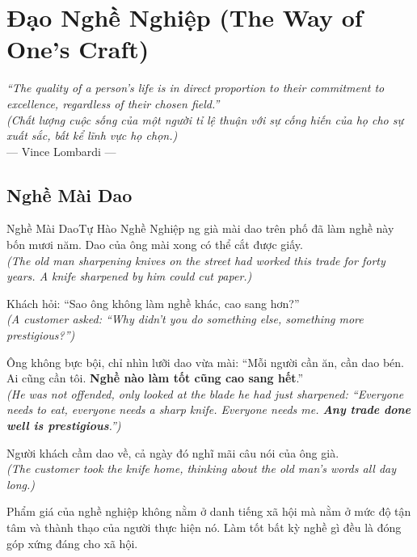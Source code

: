 \chapter{Đạo Nghề Nghiệp (The Way of One's Craft)}

\begin{center}
  \textit{\color{truyenblue}``The quality of a person's life is in direct proportion to their commitment to excellence, regardless of their chosen field.''}\\
  \textit{(Chất lượng cuộc sống của một người tỉ lệ thuận với sự cống hiến của họ cho sự xuất sắc, bất kể lĩnh vực họ chọn.)}\\[4pt]
  \small\color{truyengold}--- Vince Lombardi ---
\end{center}
\ngancach

\section{Nghề Mài Dao}
\begin{truyen}{Nghề Mài Dao}{Tự Hào Nghề Nghiệp}
ng già mài dao trên phố đã làm nghề này bốn mươi năm. Dao của ông mài xong có thể cắt được giấy.\\
\textit{(The old man sharpening knives on the street had worked this trade for forty years. A knife sharpened by him could cut paper.)}

Khách hỏi: ``Sao ông không làm nghề khác, cao sang hơn?''\\
\textit{(A customer asked: ``Why didn't you do something else, something more prestigious?'')}

Ông không bực bội, chỉ nhìn lưỡi dao vừa mài: ``Mỗi người cần ăn, cần dao bén. Ai cũng cần tôi. \textbf{Nghề nào làm tốt cũng cao sang hết}.''\\
\textit{(He was not offended, only looked at the blade he had just sharpened: ``Everyone needs to eat, everyone needs a sharp knife. Everyone needs me. \textbf{Any trade done well is prestigious}.'')}

Người khách cầm dao về, cả ngày đó nghĩ mãi câu nói của ông già.\\
\textit{(The customer took the knife home, thinking about the old man's words all day long.)}
\end{truyen}
\begin{baihoc}
  Phẩm giá của nghề nghiệp không nằm ở danh tiếng xã hội mà nằm ở mức độ tận tâm và thành thạo của người thực hiện nó. Làm tốt bất kỳ nghề gì đều là đóng góp xứng đáng cho xã hội.
\end{baihoc}

